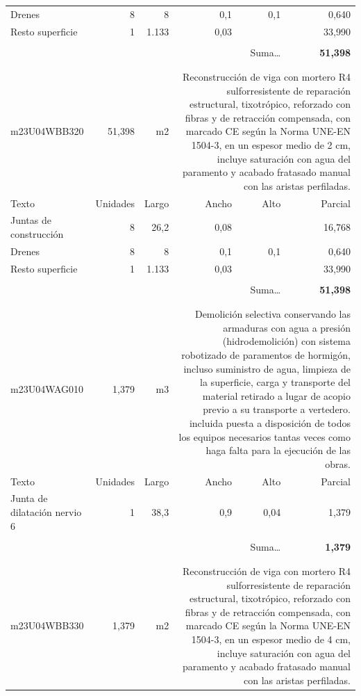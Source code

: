 \documentclass{book}%
\begin{document}
\begin{longtable}{lrrrrr}
\multicolumn{1}{p{3.5cm}}{Drenes}&8&8&0,1&0,1&     0,640\\%
\multicolumn{1}{p{3.5cm}}{Resto superficie}&1&1.133&0,03&&    33,990\\%
&&&&&\\%
\multicolumn{5}{r}{Suma\ldots}&\textbf{    51,398}\\%
\hline%
&&&&&\\%
&&&&&\\%
m23U04WBB320&    51,398& m2&\multicolumn{3}{p{6cm}}{\scriptsize Reconstrucción de viga con mortero R4 sulforresistente de reparación estructural, tixotrópico, reforzado con fibras y de retracción compensada, con marcado CE según la Norma UNE-EN 1504-3, en un espesor medio de 2 cm, incluye saturación con agua del paramento y acabado fratasado manual con las aristas perfiladas.\normalsize}\\%
Texto&Unidades&Largo&Ancho&Alto&Parcial\\%
\hline%
\multicolumn{1}{p{3.5cm}}{Juntas de construcción}&8&26,2&0,08&&    16,768\\%
\multicolumn{1}{p{3.5cm}}{Drenes}&8&8&0,1&0,1&     0,640\\%
\multicolumn{1}{p{3.5cm}}{Resto superficie}&1&1.133&0,03&&    33,990\\%
&&&&&\\%
\multicolumn{5}{r}{Suma\ldots}&\textbf{    51,398}\\%
\hline%
&&&&&\\%
&&&&&\\%
m23U04WAG010&     1,379& m3&\multicolumn{3}{p{6cm}}{\scriptsize Demolición selectiva conservando las armaduras con agua a presión (hidrodemolición) con sistema robotizado de paramentos de hormigón, incluso suministro de agua, limpieza de la superficie, carga y transporte del material retirado a lugar de acopio previo a su transporte a vertedero. incluida puesta a disposición de todos los equipos necesarios tantas veces como haga falta para la ejecución de las obras.\normalsize}\\%
Texto&Unidades&Largo&Ancho&Alto&Parcial\\%
\hline%
\multicolumn{1}{p{3.5cm}}{Junta de dilatación nervio 6}&1&38,3&0,9&0,04&     1,379\\%
&&&&&\\%
\multicolumn{5}{r}{Suma\ldots}&\textbf{     1,379}\\%
\hline%
&&&&&\\%
&&&&&\\%
m23U04WBB330&     1,379& m2&\multicolumn{3}{p{6cm}}{\scriptsize Reconstrucción de viga con mortero R4 sulforresistente de reparación estructural, tixotrópico, reforzado con fibras y de retracción compensada, con marcado CE según la Norma UNE-EN 1504-3, en un espesor medio de 4 cm, incluye saturación con agua del paramento y acabado fratasado manual con las aristas perfiladas.\normalsize}\\%

\end{longtable}
\end{document}
